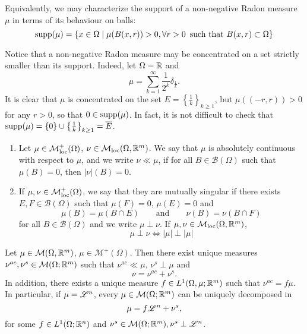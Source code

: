 \begin{exercise}
Equivalently, we may characterize the support of a non-negative Radon measure $\mu$ in terms of its behaviour on balls:
\[
\operatorname{supp} (\mu) = \{x \in \Omega \mid \mu(B(x,r)) > 0, \forall r > 0 \, \text{ such that } B(x,r) \subset \Omega\}
\]
\end{exercise}

\begin{remark}
Notice that a non-negative Radon measure may be concentrated on a set strictly smaller than its support. Indeed, let $\Omega = \mathbb{R}$ and $$\mu = \sum_{k = 1}^{\infty} \frac{1}{2^{k}} \delta_{\frac{1}{k}}.$$
It is clear that $\mu$ is concentrated on the set $E = \left \{ \frac{1}{k}\right \}_{k \ge 1}$, but $\mu((-r, r)) > 0$ for any $r> 0$, so that $0 \in \operatorname{supp}(\mu)$. In fact, it is not difficult to check that $\operatorname{supp}(\mu) = \{0\} \cup \left \{ \frac{1}{k}\right \}_{k \ge 1} = \overline{E}$. 
\end{remark}

\begin{definition}\hfill
\begin{enumerate}[1.]
\item Let $\mu \in \mathcal{M}^{+}_{\rm loc}(\Omega)$, $\nu \in \mathcal{M}_{\rm loc}(\Omega,\mathbb{R}^m)$. We say
that $\mu$ is absolutely continuous with respect to $\mu$, and we write $\nu \ll \mu$, if
for all $B \in \mathcal{B}(\Omega)$ such that $\mu(B) = 0$, then $|\nu|(B) = 0$.
\item If $\mu,\nu \in \mathcal{M}^+_{\rm loc}(\Omega)$, we say that they are mutually
singular if there exists $E,F \in \mathcal{B}(\Omega)$ such that $\mu(F) =0$,
$\mu(E) = 0$ and 
\[
\mu(B) = \mu (B\cap E) \qquad \text{and} \qquad
\nu(B) = \nu(B \cap F)
\]
for all $B \in \mathcal{B}(\Omega)$ and we write $\mu \perp \nu$. If $\mu,\nu
\in \mathcal{M}_{\rm loc}(\Omega,\mathbb{R}^m)$, 
\[
\mu \perp \nu \iff |\mu| \perp |\mu|
\]
\end{enumerate}
\end{definition}

\begin{theorem} \label{thm:Radon_Nikodym}
Let $\mu \in \mathcal{M}(\Omega,\mathbb{R}^m)$, $\mu \in \mathcal{M}^+(\Omega)$. Then
there exist unique measures $\nu^{ac},\nu^{s} \in \mathcal{M}(\Omega; \mathbb{R}^m)$ such
that $\nu^{ac} \ll \mu$, $\nu^s \perp \mu$ and 
\begin{equation} \label{eq:Leb_decomp}
\nu = \nu^{ac} + \nu^s. 
\end{equation}
In addition, there exists a unique measure $f\in L^1(\Omega,\mu;\mathbb{R}^m)$ such that
$\nu^{ac} = f\mu$.
\\
In particular, if $\mu = \mathscr{L}^{n}$, every $\mu \in \mathcal{M}(\Omega;\mathbb{R}^m)$ can be
uniquely decomposed in
\[
\mu = f \mathscr{L}^{n} + \nu^s, 
\]
for some $f\in L^1(\Omega; \mathbb{R}^n)$ and $\nu^s \in \mathcal{M}(\Omega;\mathbb{R}^m), \nu^s \perp \mathscr{L}^{n}$.
\end{theorem}

